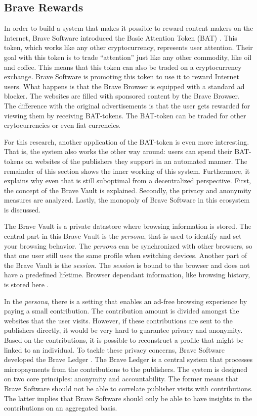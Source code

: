 \subsection{Brave Rewards}
\label{sec:brave}
In order to build a system that makes it possible to reward content makers on the Internet, Brave Software introduced the Basic Attention Token (BAT) \cite{token2018blockchain,locklin2018token}. This token, which works like any other cryptocurrency, represents user attention. Their goal with this token is to trade ``attention'' just like any other commodity, like oil and coffee. This means that this token can also be traded on a cryptocurrency exchange. Brave Software is promoting this token to use it to reward Internet users. What happens is that the Brave Browser is equipped with a standard ad blocker. The websites are filled with sponsored content by the Brave Browser. The difference with the original advertisements is that the user gets rewarded for viewing them by receiving BAT-tokens. The BAT-token can be traded for other crytocurrencies or even fiat currencies.

For this research, another application of the BAT-token is even more interesting. That is, the system also works the other way around: users can spend their BAT-tokens on websites of the publishers they support in an automated manner. The remainder of this section shows the inner working of this system. Furthermore, it explains why even that is still suboptimal from a decentralized perspective. First, the concept of the Brave Vault is explained. Secondly, the privacy and anonymity measures are analyzed. Lastly, the monopoly of Brave Software in this ecosystem is discussed.

The Brave Vault is a private datastore where browsing information is stored. The central part in this Brave Vault is the \textit{persona}, that is used to identify and set your browsing behavior. The \textit{persona} can be synchronized with other browsers, so that one user still uses the same profile when switching devices. Another part of the Brave Vault is the \textit{session}. The \textit{session} is bound to the browser and does not have a predefined lifetime. Browser dependant information, like browsing history, is stored here \cite{brave-vault}.

In the \textit{persona}, there is a setting that enables an ad-free browsing experience by paying a small contribution. The contribution amount is divided amongst the websites that the user visits. However, if these contributions are sent to the publishers directly, it would be very hard to guarantee privacy and anonymity. Based on the contributions, it is possible to reconstruct a profile that might be linked to an individual. To tackle these privacy concerns, Brave Software developed the Brave Ledger \cite{bat-ledger}. The Brave Ledger is a central system that processes micropayments from the contributions to the publishers. The system is designed on two core principles: anonymity and accountability. The former means that Brave Software should not be able to correlate publisher visits with contributions. The latter implies that Brave Software should only be able to have insights in the contributions on an aggregated basis.

